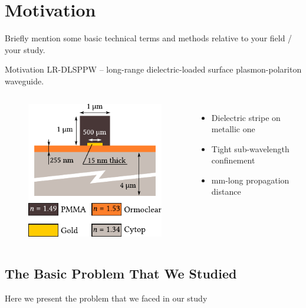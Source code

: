 \section{Motivation}
  Briefly mention some basic technical terms and methods relative to your field / your study.
  \begin{frame}{Motivation}
    LR-DLSPPW -- long-range dielectric-loaded surface plasmon-polariton waveguide.
    \begin{columns}
        \begin{figure}
          \includegraphics[width=\textwidth]{wg_profile.pdf}
        \end{figure}
        \begin{itemize}
         \item Dielectric stripe on metallic one
         \item Tight sub-wavelength confinement
         \item mm-long propagation distance
        \end{itemize}
    \end{columns}
  \end{frame}


\subsection{The Basic Problem That We Studied}
  Here we present the problem that we faced in our study \cite{webb_laser-raman_1980}

